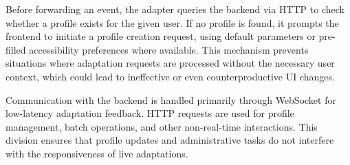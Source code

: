 \documentclass[openany]{book}
\begin{document}

Before forwarding an event, the adapter queries the backend via HTTP to check whether a profile exists for the given user. If no profile is found, it prompts the frontend to initiate a profile creation request, using default parameters or pre-filled accessibility preferences where available. This mechanism prevents situations where adaptation requests are processed without the necessary user context, which could lead to ineffective or even counterproductive UI changes.

Communication with the backend is handled primarily through WebSocket for low-latency adaptation feedback. HTTP requests are used for profile management, batch operations, and other non-real-time interactions. This division ensures that profile updates and administrative tasks do not interfere with the responsiveness of live adaptations.
\end{document}
